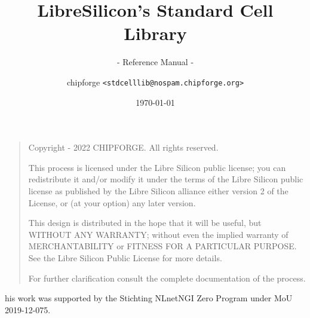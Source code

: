 \documentclass[a4paper, twoside,
               openany,
               headsepline, footsepline]{scrbook}
\title{LibreSilicon's Standard Cell Library}
\subtitle{- Reference Manual -}
\author{chipforge \texttt{<stdcelllib@nospam.chipforge.org>}}
\date{\today}
\begin{document}
\maketitle

\begin{quote}
Copyright  - 2022 CHIPFORGE. All rights reserved.

This process is licensed under the Libre Silicon public license; you can redistribute it and/or modify it under the terms of the Libre Silicon public license as published by the Libre Silicon alliance either version 2 of the License, or (at your option) any later version.

This design is distributed in the hope that it will be useful, but WITHOUT ANY WARRANTY; without even the implied warranty of MERCHANTABILITY or FITNESS FOR A PARTICULAR PURPOSE. See the Libre Silicon Public License for more details.

For further clarification consult the complete documentation of the process.
\end{quote}
\uppertitleback

This work was supported by the Stichting NLnet\footnotemark NGI Zero Program under MoU 2019-12-075.
\begin{figure}[htp]
    \begin{minipage}{.5\linewidth}
        
    \end{minipage}
    \hfill
    \begin{minipage}{.25\linewidth}
        
    \end{minipage}
\end{figure}

\vfill


\tableofcontents











\end{document}
